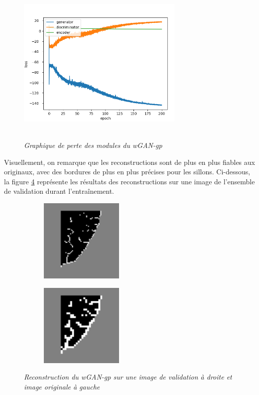 \documentclass[12pt, oneside, a4paper, titlepage]{article}
\begin{document}
\begin{figure}[H]
    \centering
\includegraphics[width=8cm, height=8cm]{lossgangp.png}
    \caption{\textit{Graphique de perte des modules du wGAN-gp}}
    \label{fig:loss_gp}
\end{figure}

Visuellement, on remarque que les reconstructions sont de plus en plus fiables aux originaux, avec des bordures de plus en plus précises pour les sillons. Ci-dessous, la figure \ref{fig:reco_GANgp} représente les résultats des reconstructions sur une image de l'ensemble de validation durant l'entraînement.

\begin{figure}[H]
\centering
\begin{subfigure}{.2\textwidth}
    \includegraphics[width=4cm, height=4cm]{valid_target199_2.png}
  \label{fig:sub1}
\end{subfigure}%
\begin{subfigure}{.2\textwidth}
  \includegraphics[width=4cm, height=4cm]{valid_img199_2.png}
  \label{fig:sub2}
\end{subfigure}
\caption{\textit{Reconstruction du wGAN-gp sur une image de validation à droite et image originale à gauche}}
\label{fig:reco_GANgp}
\end{figure}
\end{document}
